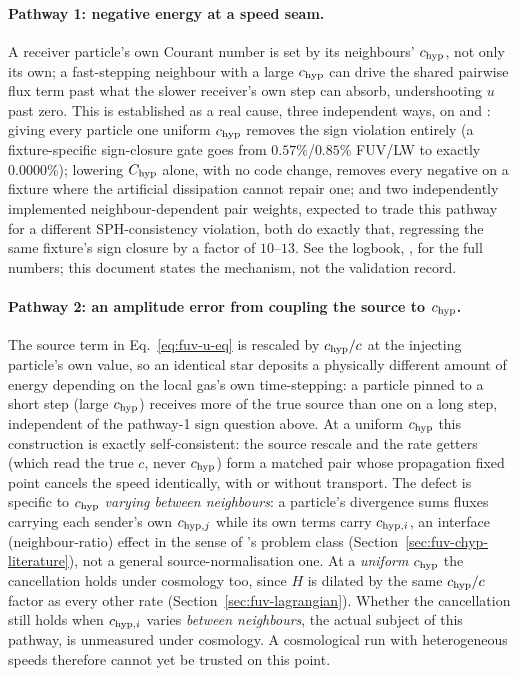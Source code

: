 \paragraph{Pathway 1: negative energy at a speed seam.} A receiver
particle's own Courant number is set by its neighbours' $c_{\rm hyp}$,
not only its own; a fast-stepping neighbour with a large $c_{\rm hyp}$
can drive the shared pairwise flux term past what the slower receiver's
own step can absorb, undershooting $u$ past zero. This is established
as a real cause, three independent ways, on
 and : giving every
particle one uniform $c_{\rm hyp}$ removes the sign violation
entirely (a fixture-specific sign-closure gate goes from $0.57\%$/$0.85\%$
FUV/LW to exactly $0.0000\%$); lowering $C_{\rm hyp}$ alone, with no code
change, removes every negative on a fixture where the artificial
dissipation cannot repair one; and two independently implemented
neighbour-dependent pair weights, expected to trade this
pathway for a different SPH-consistency violation, both do exactly that,
regressing the same fixture's sign closure by a factor of $10$--$13$. See
the  logbook, , for the full
numbers; this document states the mechanism, not the
validation record.

\paragraph{Pathway 2: an amplitude error from coupling the source to
$c_{\rm hyp}$.} The source term in Eq.~\ref{eq:fuv-u-eq} is rescaled by
$c_{\rm hyp}/c$ at the injecting particle's own value, so an identical
star deposits a physically different amount of energy depending on the
local gas's own time-stepping: a particle pinned to a short step (large
$c_{\rm hyp}$) receives more of the true source than one on a long step,
independent of the pathway-1 sign question above. At a uniform
$c_{\rm hyp}$ this construction is exactly self-consistent: the source
rescale and the rate getters (which read the
true $c$, never $c_{\rm hyp}$) form a matched pair whose propagation
fixed point cancels the speed identically, with or without transport.
The defect is specific to $c_{\rm hyp}$
\emph{varying between neighbours}: a particle's divergence sums fluxes
carrying each sender's own $c_{{\rm hyp},j}$ while its own terms carry
$c_{{\rm hyp},i}$, an interface (neighbour-ratio) effect in the sense of
\citet{Katz2017}'s problem class (Section~\ref{sec:fuv-chyp-literature}),
not a general source-normalisation one. At a \emph{uniform} $c_{\rm hyp}$
the cancellation holds under cosmology too, since $H$ is dilated by
the same $c_{\rm hyp}/c$ factor as every other rate
(Section~\ref{sec:fuv-lagrangian}). Whether the cancellation still holds when
$c_{{\rm hyp},i}$ varies \emph{between neighbours}, the actual subject of
this pathway, is unmeasured under cosmology. A cosmological run with heterogeneous
speeds therefore cannot yet be trusted on this point.

